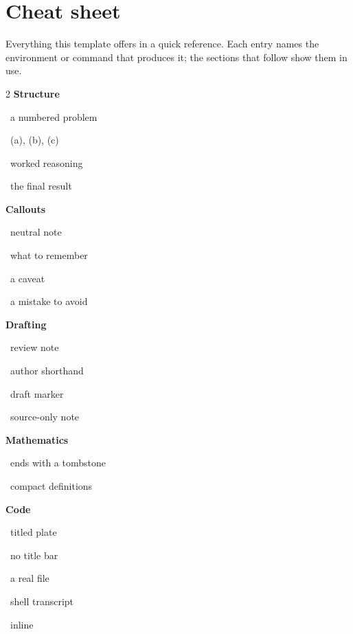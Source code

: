 \documentclass[letterpaper,11pt]{article}
\begin{document}
\makehomeworktitle

\section{Cheat sheet}

Everything this template offers in a quick reference.
Each entry names the environment or command that produces it; the sections that follow show them in use.

\begin{multicols}{2}
\noindent
\textbf{\color{rzaccent}Structure}\par
{} \dotfill\ a numbered problem\par
{} \dotfill\ (a), (b), (c)\par
{} \dotfill\ worked reasoning\par
{} \dotfill\ the final result\par

\medskip
\noindent
\textbf{\color{rzaccent}Callouts}\par
{} \dotfill\ neutral note\par
{} \dotfill\ what to remember\par
{} \dotfill\ a caveat\par
{} \dotfill\ a mistake to avoid\par

\medskip
\noindent
\textbf{\color{rzaccent}Drafting}\par
{} \dotfill\ review note\par
{} \dotfill\ author shorthand\par
{} \dotfill\ draft marker\par
{} \dotfill\ source-only note\par

\medskip
\noindent
\textbf{\color{rzaccent}Mathematics}\par
{}  \par
{}  \par
{} \dotfill\ ends with a tombstone\par
{} \dotfill\ compact definitions\par

\columnbreak
\noindent
\textbf{\color{rzaccent}Code}\par
{} \dotfill\ titled plate\par
{} \dotfill\ no title bar\par
{} \dotfill\ a real file\par
{} \dotfill\ shell transcript\par
{}  \dotfill\ inline\par


\end{multicols}
\end{document}
